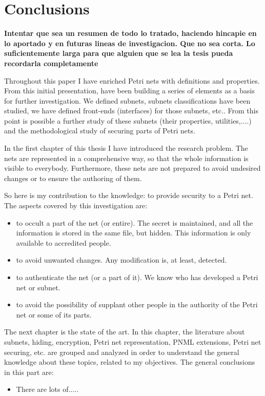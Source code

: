 
\chapter{Conclusions} %

\label{Chapter: Conclusions} %


\textbf{Intentar que sea un resumen de todo lo tratado, haciendo hincapie en lo aportado
y en futuras lineas de investigacion. Que no sea corta. Lo suficientemente
larga para que alguien que se lea la tesis pueda recordarla completamente}

Throughout this paper I have enriched Petri nets with definitions and properties. From this initial presentation, have been building a series of elements as a basis for further investigation. We defined subnets, subnets classifications have been studied, we have defined front-ends (interfaces) for those subnets, etc.. From this point is possible a further study of these subnets (their properties, utilities,....)
and the methodological study of securing parts of Petri nets. 

In the first chapter of this thesis I have introduced the research problem.
The nets are represented in a comprehensive way, so that the whole information is visible to everybody. Furthermore, these nets are not prepared to avoid undesired changes or to ensure the authoring of them.

So here is my contribution  to the knowledge: to provide security to a Petri net. The aspects covered by this investigation are:


\begin{itemize}
\item 
to occult a part of the net (or entire). The secret is maintained, and all the information
is stored in the same file, but hidden.
This information is only available to accredited people.
\item to avoid unwanted changes.
Any modification is, at least, detected.\item to authenticate the net (or a part of it). We know who has developed
a Petri net or subnet.
\item to avoid the possibility of supplant other people in the authority of
the Petri net or some of its parts.
\end{itemize}


The next chapter is the state of the art. In this chapter, the literature
about subnets, hiding, encryption, Petri net representation, PNML extensions,
Petri net securing, etc. are grouped and analyzed in order to understand the general knowledge about these topics, related to my objectives. The general conclusions in this part are:
\begin{itemize}
\item There are lots of..... 
\end{itemize}
 
   
